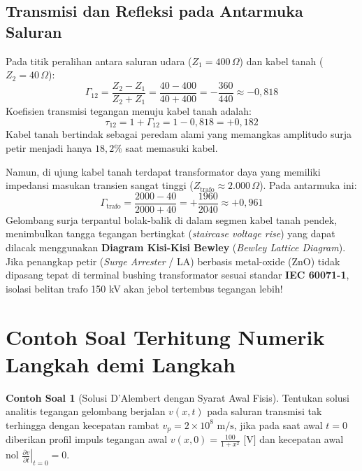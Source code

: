 \documentclass[11pt,a4paper]{article}
\theoremstyle{definition}
\newtheorem{example}{Contoh Soal}[section]
\begin{document}
\subsection{Transmisi dan Refleksi pada Antarmuka Saluran}
Pada titik peralihan antara saluran udara ($Z_1 = 400\,\Omega$) dan kabel tanah ($Z_2 = 40\,\Omega$):
\begin{equation}
    \Gamma_{12} = \frac{Z_2 - Z_1}{Z_2 + Z_1} = \frac{40 - 400}{40 + 400} = -\frac{360}{440} \approx -0{,}818
\end{equation}
Koefisien transmisi tegangan menuju kabel tanah adalah:
\begin{equation}
    \tau_{12} = 1 + \Gamma_{12} = 1 - 0{,}818 = +0{,}182
\end{equation}
Kabel tanah bertindak sebagai peredam alami yang memangkas amplitudo surja petir menjadi hanya $18{,}2\%$ saat memasuki kabel.

Namun, di ujung kabel tanah terdapat transformator daya yang memiliki impedansi masukan transien sangat tinggi ($Z_{\text{trafo}} \approx 2.000\,\Omega$). Pada antarmuka ini:
\begin{equation}
    \Gamma_{\text{trafo}} = \frac{2000 - 40}{2000 + 40} = +\frac{1960}{2040} \approx +0{,}961
\end{equation}
Gelombang surja terpantul bolak-balik di dalam segmen kabel tanah pendek, menimbulkan tangga tegangan bertingkat (\textit{staircase voltage rise}) yang dapat dilacak menggunakan \textbf{Diagram Kisi-Kisi Bewley} (\textit{Bewley Lattice Diagram}). Jika penangkap petir (\textit{Surge Arrester} / LA) berbasis metal-oxide (ZnO) tidak dipasang tepat di terminal bushing transformator sesuai standar \textbf{IEC 60071-1}, isolasi belitan trafo 150 kV akan jebol tertembus tegangan lebih!

\section{Contoh Soal Terhitung Numerik Langkah demi Langkah}

\begin{example}[Solusi D'Alembert dengan Syarat Awal Fisis]
Tentukan solusi analitis tegangan gelombang berjalan $v(x, t)$ pada saluran transmisi tak terhingga dengan kecepatan rambat $v_p = 2 \times 10^8\text{ m/s}$, jika pada saat awal $t = 0$ diberikan profil impuls tegangan awal $v(x, 0) = \frac{100}{1 + x^2}\text{ [V]}$ dan kecepatan awal nol $\left.\frac{\partial v}{\partial t}\right|_{t=0} = 0$.
\end{example}
\end{document}
